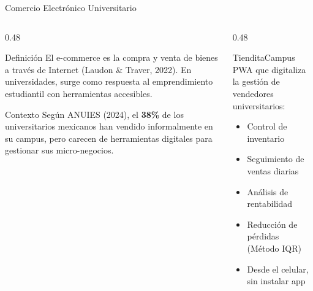 \documentclass[aspectratio=169, 12pt]{beamer}
\newcommand{\tag}[1]{%
  \tikz[baseline=(t.base)]{\node[fill=bg2, draw=yellow1!30, text=yellow1,
  rounded corners=8pt, inner xsep=6pt, inner ysep=2pt,
  font=\tiny\bfseries] (t) {\MakeUppercase{#1}};}%
}
\begin{document}
\begin{frame}{\tag{Marco Te\'orico} \; Comercio Electr\'onico {\color{red1}Universitario}}
\vspace{4pt}
\begin{columns}[T]
\begin{column}{0.48\textwidth}
\begin{block}{Definici\'on}
\small El e-commerce es la compra y venta de bienes a trav\'es de Internet (Laudon \& Traver, 2022). En universidades, surge como respuesta al emprendimiento estudiantil con herramientas accesibles.
\end{block}
\begin{block}{Contexto}
\small Seg\'un ANUIES (2024), el \textbf{38\%} de los universitarios mexicanos han vendido informalmente en su campus, pero carecen de herramientas digitales para gestionar sus micro-negocios.
\end{block}
\end{column}
\begin{column}{0.48\textwidth}
\begin{alertblock}{TienditaCampus}
\small PWA que digitaliza la gesti\'on de vendedores universitarios:
\begin{itemize}\small
  \item Control de inventario
  \item Seguimiento de ventas diarias
  \item An\'alisis de rentabilidad
  \item Reducci\'on de p\'erdidas (M\'etodo IQR)
  \item Desde el celular, sin instalar app
\end{itemize}
\end{alertblock}
\end{column}
\end{columns}
\end{frame}
\end{document}
